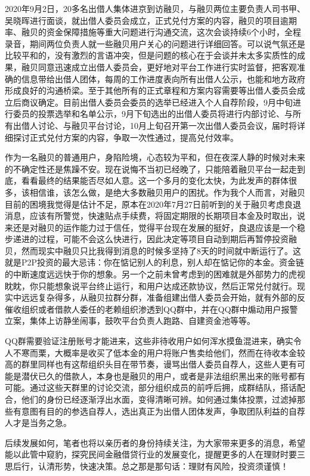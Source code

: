 \documentclass[
]{book}
\begin{document}
2020年9月2日，20多名出借人集体进京到访融贝，与融贝两位主要负责人司书甲、吴晓晖进行面谈，就出借人委员会成立，正式兑付方案的内容，融贝的项目逾期率、融贝的资金保障措施等重大问题进行沟通交流，这次会谈持续6个小时，全程录音，期间两位负责人就一些融贝用户关心的问题进行详细回答。可以说气氛还是比较平和的，没有激烈的言语冲突，但是问题的核心在于会谈并未太多实质性的成果，融贝同意迅速成立出借人委员会，更好地对平台工作进行实时监督，把客观准确的信息带给出借人团体，每周的工作进度表向所有出借人公示，也能和地方政府形成良好的沟通桥梁。至于其他所有的正式章程和方案内容需要等出借人委员会成立后商议确定。目前出借人委员会委员的选举已经进入个人自荐阶段，9月中旬进行委员的投票选举和名单公示，9月下旬选出的出借人委员将进行内部讨论、与所有出借人讨论、与融贝平台讨论，10月上旬召开第一次出借人委员会议，届时将详细探讨正式兑付方案的内容，争取一次性通过，提高兑付效率。

作为一名融贝的普通用户，身陷险境，心态较为平和，但在夜深人静的时候对未来的不确定性还是焦躁不安。现在说悔不当初已经晚了，只能陪着融贝平台一起走到底，看看最终的结果能否尽如人意。这一个多月的变化太快，为此发声的群体很多，该相信谁，该怎么做，是绝大多数融贝用户的困扰。作为我个人而言，对融贝目前的困境我觉得是估计不足，原本在2020年7月27日前听到的关于融贝考虑良退消息，应该有所警觉，快速贴点手续费，将固定期限的长期项目本金及时取出，说来还是对融贝的运作能力过于信任，觉得平台现在发展的挺好，良退应该是一个稳步递进的过程，可能不会这么快进行，因此决定等项目自动到期后再暂停投资融贝，然而现实中融贝只比我得到消息的时候多坚持了8天的时间就中断运行了。这就是P2P投资的最大忌讳：你在惦记别人的利息，别人却在惦记你的本金。资金链的中断速度远远快于你的想象。另一个之前未曾考虑到的困难就是外部势力的虎视眈眈，你只能想象说平台终止运行，和用户达成还款协议，然后正常兑付就行。现实中远远复杂得多，从融贝拉群分群，准备组建出借人委员会开始，就有外部的反催收组织或者借款人委任的老赖组织渗透到QQ群中，并在QQ群中煽动用户报警立案，集体上访静坐闹事，鼓吹平台负责人跑路、自建资金池等等。

QQ群需要验证注册账号才能进来，这些非待收用户如何浑水摸鱼混进来，确实令人不寒而栗，大概率是收买了低本金的用户将账户售卖给他们，然而在待收本金较高的群里同样也有这帮组织头目在带节奏，谩骂出借人委员自荐人，这些人更有可能是潜伏已久的借款人，本身也是融贝的用户，或者是非法组织黑出来的账号都有可能。通过这些天群里的讨论交流，部分组织成员的前呼后拥，成群结队，搭话配合，他们的身份已经逐渐浮出水面，变得清晰可辨。如何通过集体投票，过滤掉那些有意图有目的的参选自荐人，选出真正为出借人团体发声，争取团队利益的自荐人才是当务之急。

后续发展如何，笔者也将以亲历者的身份持续关注，为大家带来更多的消息，希望能以此管中窥豹，探究民间金融借贷行业的发展变化，提醒更多的人在理财时要三思后行，认清形势，快速决策。总之那是那句话：理财有风险，投资须谨慎！
\end{document}
